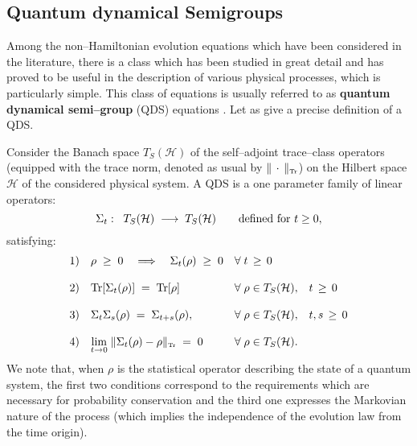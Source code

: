 \documentclass[10pt,a4paper]{article}
\begin{document}
\subsection{Quantum dynamical Semigroups} \label{sec56}

Among the non--Hamiltonian evolution equations which have been
considered in the literature, there is a class which has been
studied in great detail and has proved to be useful in the
description of various physical processes, which is particularly
simple. This class of equations is usually referred to as {\bf
quantum dynamical semi--group} (QDS) equations \cite{lin}. Let as
give a precise definition of a QDS.

Consider the Banach space $T_{S}({\mathcal H})$ of the
self--adjoint trace--class operators (equipped with the trace
norm, denoted as usual by $\|\,\cdot\,\|_{\makebox{\tiny Tr}}$) on
the Hilbert space ${\mathcal H}$ of the considered physical
system. A QDS is a one parameter family of linear operators:
\[
\Sigma_{t}: \;\; T_{S}({\mathcal H}) \; \longrightarrow \;
T_{S}({\mathcal H}) \qquad \makebox{defined for $t \geq 0$},
\]
satisfying:
\[
\begin{array}{lll}
1) & \rho \; \geq \; 0 \quad \Longrightarrow \quad
\Sigma_{t}(\rho) \; \geq \; 0 & \forall\; t \, \geq \, 0 \\
& & \\
2) & \makebox{Tr} [\Sigma_{t}(\rho)] \; = \; \makebox{Tr} [\rho]
\quad & \forall\; \rho  \in
T_{S}({\mathcal H}), \;\;\; t \, \geq \, 0 \\
& & \\
3) & \Sigma_{t} \Sigma_{s} (\rho) \; = \; \Sigma_{t+s} (\rho), &
\forall\; \rho  \in T_{S}({\mathcal H}), \;\;\;
t, s \, \geq \, 0 \\
& & \\
4) & {\displaystyle \lim_{t\rightarrow 0}}\; \| \Sigma_{t}(\rho) -
\rho \|_{\makebox{\tiny Tr}} \; = \; 0 & \forall\; \rho \in
T_{S}({\mathcal H}).
\end{array}
\]
We note that, when $\rho$ is the statistical operator describing
the state of a quantum system, the first two conditions correspond
to the requirements which are necessary for probability
conservation and the third one expresses the Markovian nature of
the process (which implies the independence of the evolution law
from the time origin).
\end{document}
